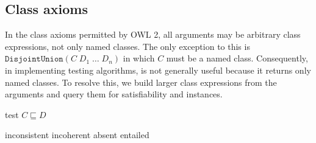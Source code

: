 \documentclass[paper.tex]{subfiles}
\begin{document}
\subsection{Class axioms}
\label{sec:algorithms:class}


In the class axioms permitted by OWL 2, all arguments may be arbitrary class expressions, not only named classes.  The only exception to this is $\mathtt{DisjointUnion}(C \; D_1 \; \ldots \; D_n)$ in which $C$ must be a named class.  Consequently, in implementing testing algorithms,  is not generally useful because it returns only named classes.  To resolve this, we build larger class expressions from the arguments and query them for satisfiability and instances.

\begin{algorithm}[H]
  \caption{test $C \sqsubseteq D$}
  \begin{algorithmic}[1]
    \raggedright
        \State \Return inconsistent
        \label{alg:testSubClassOf:returnInconsistent}
        \State \Return incoherent
        \label{alg:testSubClassOf:returnIncoherent}
        \State \Return absent
      \Else
        \State \Return entailed
        \label{alg:testSubClassOf:returnEntailed}
      \EndIf
    \EndFunction
  \end{algorithmic}
\end{algorithm}
\end{document}
